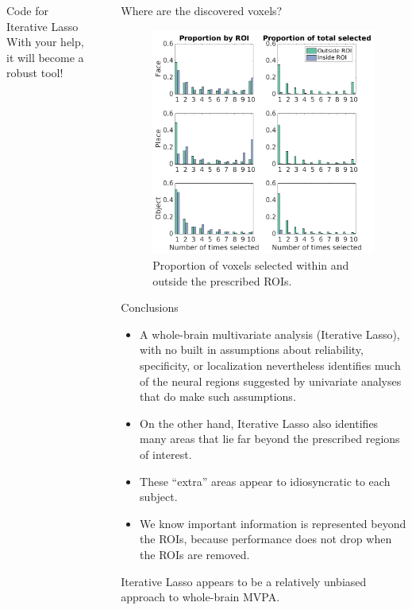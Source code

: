 \documentclass[final]{beamer}
\newlength{\sepwid}
\newlength{\introcolwid}
\begin{document}
\begin{frame}[t]
\begin{columns}[t]
\begin{column}{\introcolwid}
\begin{alertblock}{Code for Iterative Lasso}
			With your help, it will become a robust tool!
		\end{alertblock}
	\end{column}
	\begin{column}{\sepwid}\end{column}			%
	\begin{column}{\introcolwid}
      \begin{block}{Where are the discovered voxels?}
		\begin{figure}
			\includegraphics[width=\textwidth]{figures/Summary_ProportionSelected.png}
			\caption{Proportion of voxels selected within and outside the prescribed ROIs.}
		\end{figure}
      \end{block}
      
      \begin{block}{Conclusions}
      	\begin{itemize}
      		\item A whole-brain multivariate analysis (Iterative Lasso), with no built in assumptions about reliability, specificity, or localization nevertheless identifies much of the neural regions suggested by univariate analyses that do make such assumptions.
      		\item On the other hand, Iterative Lasso also identifies many areas that lie far beyond the prescribed regions of interest.
      		\item These ``extra'' areas appear to idiosyncratic to each subject.  
      		\item We know important information is represented beyond the ROIs, because performance does not drop when the ROIs are removed.
      	\end{itemize}
      	Iterative Lasso appears to be a relatively unbiased approach to whole-brain MVPA.


\end{block}
\end{column}
\end{columns}
\end{frame}
\end{document}
